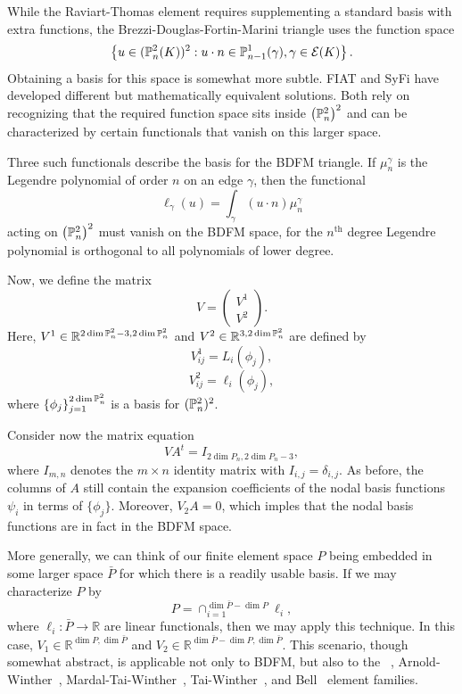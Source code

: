 While the Raviart-Thomas element requires supplementing a standard
basis with extra functions, the Brezzi-Douglas-Fortin-Marini triangle
uses the function space
\[
\left\{
u \in (\P^2_n (K) )^2 : u \cdot n \in \P^1_{n-1}(\gamma), \gamma \in
\mathcal{E}(K)
\right\}.
\]
Obtaining a basis for this space
is somewhat more subtle.  FIAT and SyFi have developed different
but mathematically equivalent solutions.  Both rely on recognizing that the
required function space sits inside \( \left( \P^2_n \right)^2 \) and can
be characterized by certain functionals that vanish on this larger
space.

Three such functionals describe the basis for the BDFM triangle.
If \( \mu^\gamma_n \)
is the Legendre polynomial of order \( n \) on an edge \( \gamma \),
then the functional
\[
\ell_\gamma( u ) = \int_{\gamma} (u \cdot n) \mu_n^\gamma
\]
acting on \( \left( \P^2_n \right)^2 \)
must vanish on the BDFM space, for the \( n^\mathrm{th} \) degree
Legendre polynomial is orthogonal to all polynomials of lower degree.

Now, we define the matrix
\begin{equation}
V = \left( \begin{array}{c} V^1 \\ V^2 \end{array} \right).
\end{equation}
Here, \( V^1 \in \mathbb{R}^{2 \dim \P^2_n - 3, 2\dim \P^2_n} \) and
\( V^2 \in \mathbb{R}^{3, 2 \dim \P^2_n} \) are defined
by
\[V^1_{ij} = L_i( \phi_j ),
\]
\[
V^2_{ij} = \ell_i( \phi_j ),
\]
where \( \{ \phi_j \}_{j=1}^{2 \dim{\P^2_n}} \) is a basis for \( (\P^2_n)^2
\).

Consider now the matrix
equation
\begin{equation}
\label{eq:extendedvdmsystem}
V A^t = I_{2 \dim P_n , 2 \dim P_n -3},
\end{equation}
where \( I_{m,n} \) denotes the \( m \times n \) identity matrix with
\( I_{i,j} = \delta_{i,j} \).  As before, the columns of \( A \) still
contain the expansion coefficients of the nodal basis functions
\( \psi_i \) in terms of \( \{ \phi_j \} \).
Moreover, \( V_2 A = 0 \), which imples that the nodal basis functions
are in fact in the BDFM space.

More generally, we can think of our finite element space \( P \) being
embedded in some larger space \( \bar{P} \) for which there is
a readily usable basis.  If we may characterize \( P \) by
\[
P = \cap_{i=1}^{\dim{\bar{P}}-\dim P} \ell_i,
\]
where \( \ell_i : \bar{P} \rightarrow \mathbb{R} \) are linear
functionals, then we may apply this technique.  In this case,
\( V_1 \in \mathbb{R}^{\dim{P},\dim{\bar{P}}} \) and
\( V_2 \in \mathbb{R}^{\dim{\bar{P}}-\dim P,\dim{\bar{P}}} \).  This
scenario, though somewhat abstract, is applicable not only to BDFM,
but also to the \nedelec~\citep{Nedelec1980}, Arnold-Winther~\citep{ArnoldWinther2002},
Mardal-Tai-Winther~\citep{MardalTaiWinther2002}, Tai-Winther~\citep{TaiWinther2006}, and Bell~\citep{missing} element families.

